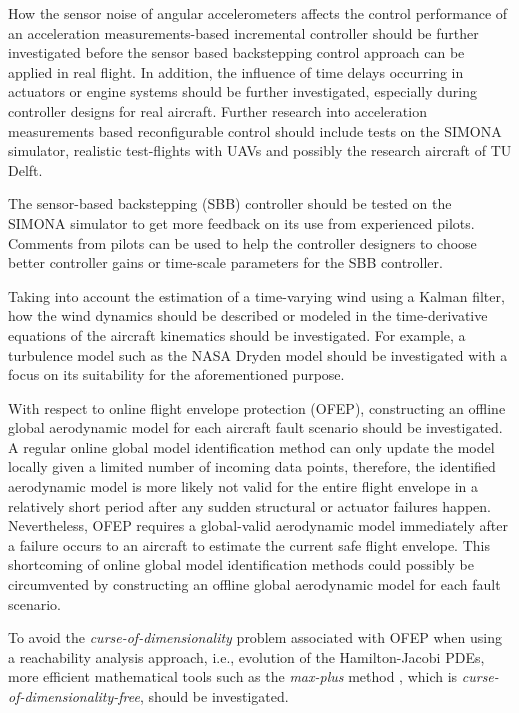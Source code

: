 How the sensor noise of angular accelerometers affects the control performance of an acceleration measurements-based incremental controller should be further investigated before the sensor based backstepping control approach can be applied in real flight. In addition, the influence of time delays occurring in actuators or engine systems should be further investigated, especially during controller designs for real aircraft. Further research into acceleration measurements based reconfigurable control should include tests on the SIMONA simulator, realistic test-flights with UAVs and possibly the research aircraft of TU Delft.

The sensor-based backstepping (\ac{SBB})  controller should be tested on the SIMONA simulator to get more feedback on its use from experienced pilots. Comments from pilots can be used to help the controller designers to choose better controller gains or time-scale parameters for the \ac{SBB} controller.

Taking into account the estimation of a time-varying wind using a Kalman filter, how the wind dynamics should be described or modeled in the time-derivative equations of the aircraft kinematics should be investigated. For example, a turbulence model such as the NASA Dryden model should be investigated with a focus on its suitability for the aforementioned purpose.

With respect to online flight envelope protection (\ac{OFEP}), constructing an offline global aerodynamic model for each aircraft fault scenario should be investigated. A regular online global model identification method can only update the model locally given a limited number of incoming data points, therefore, the identified aerodynamic model is more likely not valid for the entire flight envelope in a relatively short period after any sudden structural or actuator failures happen. Nevertheless, \ac{OFEP} requires a global-valid aerodynamic model immediately after a failure occurs to an aircraft to estimate the current safe flight envelope. This shortcoming of online global model identification methods could possibly be circumvented by constructing an offline global aerodynamic model for each fault scenario.

To avoid the \textit{curse-of-dimensionality} problem associated with \ac{OFEP} when using a reachability analysis approach, i.e., evolution of the Hamilton-Jacobi PDEs, more efficient mathematical tools such as the \textit{max-plus} method \cite{mceneaney05}, which is \textit{curse-of-dimensionality-free}, should be investigated. 


\cleardoublepage